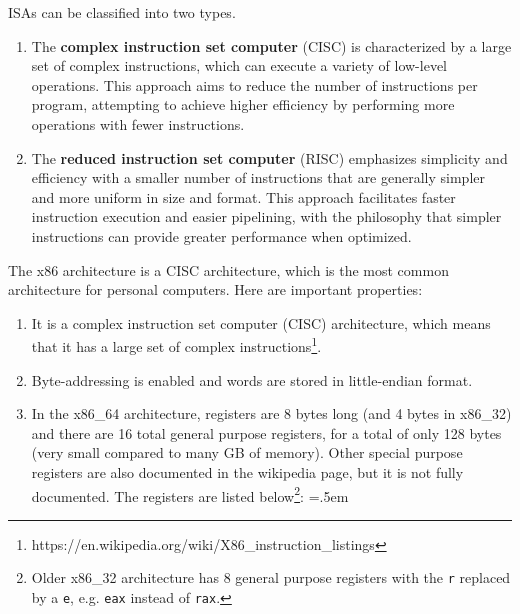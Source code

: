 \documentclass{article}
\newenvironment{cverbatim}
    {\SaveVerbatim{cverb}}
    {\endSaveVerbatim
    \flushleft\fboxrule=0pt\fboxsep=.5em
    \colorbox{cverbbg}{%
      \makebox[\dimexpr\linewidth-2\fboxsep][l]{\BUseVerbatim{cverb}}%
    }
    \endflushleft
  }
\begin{document}
    
    \begin{definition}
      ISAs can be classified into two types. 
      \begin{enumerate} 
        \item The \textbf{complex instruction set computer} (CISC) is characterized by a large set of complex instructions, which can execute a variety of low-level operations. This approach aims to reduce the number of instructions per program, attempting to achieve higher efficiency by performing more operations with fewer instructions.
        \item The \textbf{reduced instruction set computer} (RISC) emphasizes simplicity and efficiency with a smaller number of instructions that are generally simpler and more uniform in size and format. This approach facilitates faster instruction execution and easier pipelining, with the philosophy that simpler instructions can provide greater performance when optimized.
      \end{enumerate}
    \end{definition}

    \begin{example}[x86 Architecture]
      The x86 architecture is a CISC architecture, which is the most common architecture for personal computers. Here are important properties: 
      \begin{enumerate} 
        \item It is a complex instruction set computer (CISC) architecture, which means that it has a large set of complex instructions\footnote{https://en.wikipedia.org/wiki/X86\_instruction\_listings}. 
        \item Byte-addressing is enabled and words are stored in little-endian format.
        \item In the x86\_64 architecture, registers are 8 bytes long (and 4 bytes in x86\_32) and there are 16 total general purpose registers, for a total of only 128 bytes (very small compared to many GB of memory). Other special purpose registers are also documented in the wikipedia page, but it is not fully documented. The registers are listed below\footnote{Older x86\_32 architecture has 8 general purpose registers with the \texttt{r} replaced by a \texttt{e}, e.g. \texttt{eax} instead of \texttt{rax}.}: 
        \begin{cverbatim} 
        \end{cverbatim}
        

      \end{enumerate}

    \end{example}
\end{document}
